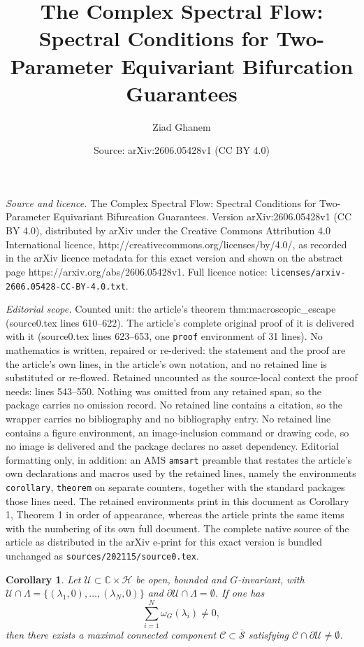\documentclass[10pt,a4paper]{amsart}
\title{The Complex Spectral Flow: Spectral Conditions for Two-Parameter Equivariant Bifurcation Guarantees}
\author{Ziad Ghanem}
\date{Source: arXiv:2606.05428v1 (CC BY 4.0)}
\newtheorem{corollary}{Corollary}
\def\bc{{\mathbb{C}}}
\begin{document}
\maketitle

\noindent\emph{Source and licence.} The Complex Spectral Flow: Spectral Conditions for Two-Parameter Equivariant Bifurcation Guarantees. Version arXiv:2606.05428v1 (CC BY 4.0), distributed by arXiv under the Creative Commons Attribution 4.0 International licence, http://creativecommons.org/licenses/by/4.0/, as recorded in the arXiv licence metadata for this exact version and shown on the abstract page https://arxiv.org/abs/2606.05428v1. Full licence notice: \texttt{licenses/arxiv-2606.05428-CC-BY-4.0.txt}.\par\smallskip

\noindent\textit{Editorial scope.} Counted unit: the article's theorem thm:macroscopic\_escape (source0.tex lines 610--622). The article's complete original proof of it is delivered with it (source0.tex lines 623--653, one \texttt{proof} environment of 31 lines). No mathematics is written, repaired or re-derived: the statement and the proof are the article's own lines, in the article's own notation, and no retained line is substituted or re-flowed.  Retained uncounted as the source-local context the proof needs: lines 543--550.  Nothing was omitted from any retained span, so the package carries no omission record.  No retained line contains a citation, so the wrapper carries no bibliography and no bibliography entry.  No retained line contains a figure environment, an image-inclusion command or drawing code, so no image is delivered and the package declares no asset dependency.  Editorial formatting only, in addition: an AMS \texttt{amsart} preamble that restates the article's own declarations and macros used by the retained lines, namely the environments \texttt{corollary}, \texttt{theorem} on separate counters, together with the standard packages those lines need.  The retained environments print in this document as Corollary 1, Theorem 1 in order of appearance, whereas the article prints the same items with the numbering of its own full document.  The complete native source of the article as distributed in the arXiv e-print for this exact version is bundled unchanged as \texttt{sources/202115/source0.tex}.
\begin{corollary}\label{cor:macro_escape}
Let $\mathcal U\subset \bc\times\mathscr H$ be open, bounded and $G$-invariant, with $\mathcal U\cap\Lambda=\{(\lambda_1,0),\ldots, (\lambda_N,0)\}$ and $\partial\mathcal U\cap\Lambda=\emptyset$. If one has
\[
\sum_{i=1}^N \omega_G(\lambda_i)\neq 0,
\]
then there exists a maximal connected component
$\mathscr C\subset\overline{\mathscr S}$ satisfying $\mathscr C\cap\partial\mathcal U\neq\emptyset$.
\end{corollary}
\end{document}
